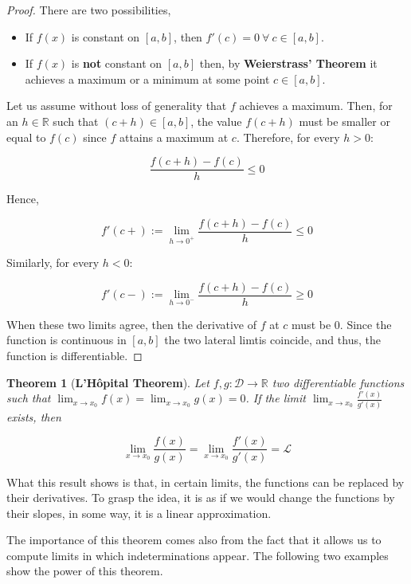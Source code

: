 \documentclass[a4paper,11pt]{article}
\theoremstyle{definition}
\theoremstyle{plain}
\newtheorem{theorem}{Theorem}
\begin{document}
\begin{proof}
There are two possibilities, 

\begin{itemize}
    \item If \(f(x)\) is constant on \([a,b]\), then \(f'(c) = 0 \ \forall \ c\in[a,b]\). 

    \item If \(f(x)\) is \textbf{not} constant on \([a,b]\) then, by \textbf{Weierstrass' Theorem} it achieves a maximum or a minimum at some point \(c\in[a,b]\). 
\end{itemize}

Let us assume without loss of generality that \(f\) achieves a maximum. Then, for an \(h\in\mathbb{R}\) such that \((c+h)\in[a,b]\), the value \(f(c+h)\) must be smaller or equal to \(f(c)\) since \(f\) attains a maximum at \(c\). Therefore, for every \(h > 0\):

\[
\frac{f(c + h)-f(c)}{h} \leq 0
\]

Hence,

\[
f'(c+) := \lim_{h\rightarrow 0^+}{\frac{f(c+h)-f(c)}{h}} \leq 0
\]

Similarly, for every \(h < 0\):

\[
f'(c-) := \lim_{h\rightarrow 0^-}{\frac{f(c+h)-f(c)}{h}} \geq 0
\]

When these two limits agree, then the derivative of \(f\) at \(c\) must
be \(0\). Since the function is continuous in \([a,b]\) the two lateral
limtis coincide, and thus, the function is differentiable.
\end{proof}

\begin{theorem}[\textbf{L'H\^opital Theorem}]
Let \(f,g : \mathcal{D} \rightarrow \mathbb{R}\) two differentiable
functions such that \(\lim_{x\rightarrow x_0} f(x) = \lim_{x\rightarrow x_0} g(x) = 0\). If the limit \(\lim_{x\rightarrow x_0}{\frac{f'(x)}{g'(x)}}\) exists, then

\[
\lim_{x\rightarrow x_0}{\frac{f(x)}{g(x)}} = \lim_{x\rightarrow x_0}{\frac{f'(x)}{g'(x)}} = \mathcal{L}
\]
\end{theorem}

What this result shows is that, in certain limits, the functions can be
replaced by their derivatives. To grasp the idea, it is as if we would
change the functions by their slopes, in some way, it is a linear
approximation.

The importance of this theorem comes also from the fact that it allows
us to compute limits in which indeterminations appear. The following two
examples show the power of this theorem.
\end{document}
